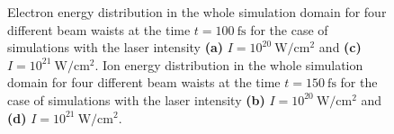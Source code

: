 \begin{figure}[h!]
	\hspace{1mm}
	\caption{Electron energy distribution in the whole simulation domain for four different beam waists at the time $ t = 100 \ \mathrm{fs} $ for the case of simulations with the laser intensity \textbf{(a)} $ I = 10^{20} \ \mathrm{W/cm^2} $ and \textbf{(c)} $ I = 10^{21} \ \mathrm{W/cm^2} $. Ion energy distribution in the whole simulation domain for four different beam waists at the time $ t = 150 \ \mathrm{fs} $ for the case of simulations with the laser intensity \textbf{(b)} $ I = 10^{20} \ \mathrm{W/cm^2} $ and \textbf{(d)} $ I = 10^{21} \ \mathrm{W/cm^2} $.}
	\label{fig:14}
\end{figure}